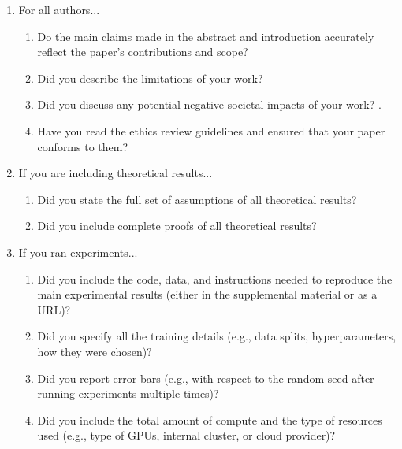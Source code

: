 \documentclass{article}
\begin{document}
\begin{enumerate}

\item For all authors...
\begin{enumerate}
  \item Do the main claims made in the abstract and introduction accurately reflect the paper's contributions and scope?
    \answerYes{}
  \item Did you describe the limitations of your work?
  \item Did you discuss any potential negative societal impacts of your work?
    .
  \item Have you read the ethics review guidelines and ensured that your paper conforms to them?
    \answerYes{}
\end{enumerate}

\item If you are including theoretical results...
\begin{enumerate}
  \item Did you state the full set of assumptions of all theoretical results?
    \answerNA{}
	\item Did you include complete proofs of all theoretical results?
    \answerNA{}
\end{enumerate}

\item If you ran experiments...
\begin{enumerate}
  \item Did you include the code, data, and instructions needed to reproduce the main experimental results (either in the supplemental material or as a URL)?
    \answerYes{}
  \item Did you specify all the training details (e.g., data splits, hyperparameters, how they were chosen)?
    \answerYes{}
	\item Did you report error bars (e.g., with respect to the random seed after running experiments multiple times)?
    \answerYes{}
	\item Did you include the total amount of compute and the type of resources used (e.g., type of GPUs, internal cluster, or cloud provider)?
    \answerYes{}
\end{enumerate}


\end{enumerate}
\end{document}
